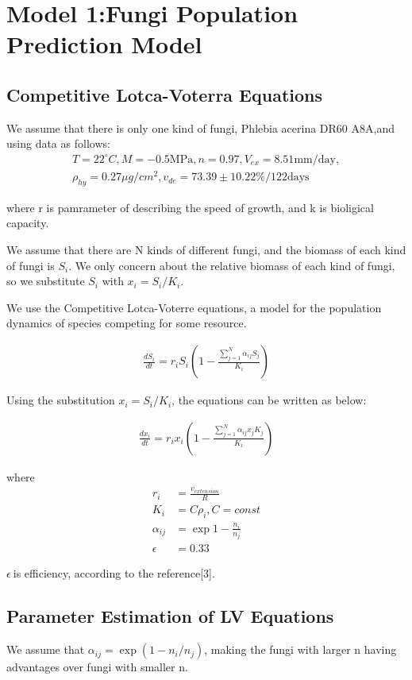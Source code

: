 \section{Model 1:Fungi Population Prediction Model}
		\subsection{Competitive Lotca-Voterra Equations}
        We assume that there is only one kind of fungi, Phlebia acerina DR60 A8A,and using data as follows:
\begin{align}%
    T=22^{\circ}C,M=-0.5\text{MPa},n=0.97,V_{ex}=8.51\text{mm/day},\nonumber\\
    \rho_{hy}=0.27\mu g/cm^2,v_{de}=73.39\pm 10.22\%/122\text{days}\nonumber
\end{align}



 where r is pamrameter of describing the speed of growth, and k is bioligical capacity.

We assume that there are N kinds of different fungi, and the biomass of each kind of fungi is $S_i$. We only concern about the relative biomass of each kind of fungi, so we substitute $S_i$ with $x_i=S_i/K_i$.

We use the Competitive Lotca-Voterre equations, a model for the population dynamics of species competing for some resource. 

\begin{align}
    \frac{dS_i}{dt}=r_i S_i  (1- \frac{\sum_{j=1}^{N}\alpha_{ij}S_j}{K_i})
\end{align}

Using the substitution $x_i=S_i/K_i$, the equations can be written as below:

\begin{align}
    \frac{dx_i}{dt}=r_i x_i  (1- \frac{\sum_{j=1}^{N}\alpha_{ij}x_jK_j}{K_i})
\end{align}

where
\begin{align}
    r_i&=\frac{v_{extension}}{R}\\
    K_i&=C\rho_i,C=const\\
    \alpha_{ij}&=\exp{1-\frac{n_i}{n_j}}\\
    \epsilon&=0.33
\end{align}

$\epsilon\:$is efficiency, according to the reference[3].
		\subsection{Parameter Estimation of LV Equations}
        We assume that $\alpha_{ij}=\exp(1-n_i/n_j)$, making the fungi with larger n having advantages over fungi with smaller n.
